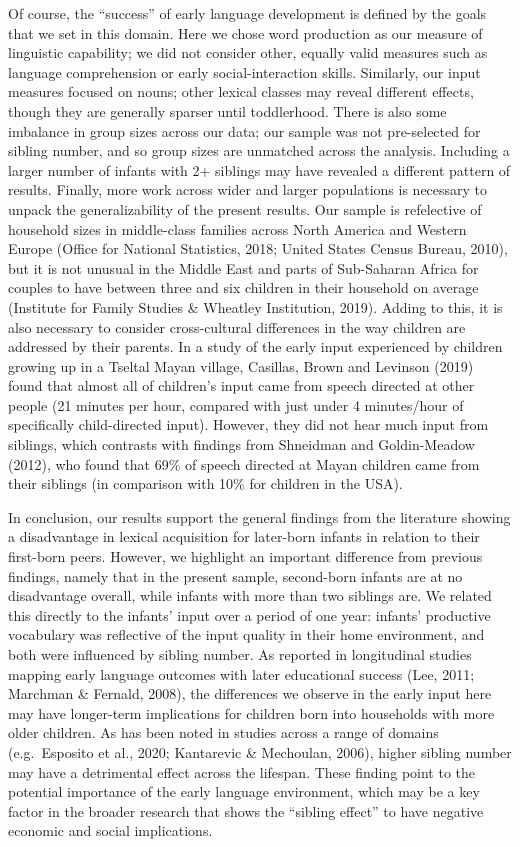 \documentclass[
  english,
  man,floatsintext]{apa6}
\begin{document}
Of course, the \enquote{success} of early language development is defined by the goals that we set in this domain. Here we chose word production as our measure of linguistic capability; we did not consider other, equally valid measures such as language comprehension or early social-interaction skills. Similarly, our input measures focused on nouns; other lexical classes may reveal different effects, though they are generally sparser until toddlerhood. There is also some imbalance in group sizes across our data; our sample was not pre-selected for sibling number, and so group sizes are unmatched across the analysis. Including a larger number of infants with 2+ siblings may have revealed a different pattern of results. Finally, more work across wider and larger populations is necessary to unpack the generalizability of the present results. Our sample is refelective of household sizes in middle-class families across North America and Western Europe (Office for National Statistics, 2018; United States Census Bureau, 2010), but it is not unusual in the Middle East and parts of Sub-Saharan Africa for couples to have between three and six children in their household on average (Institute for Family Studies \& Wheatley Institution, 2019). Adding to this, it is also necessary to consider cross-cultural differences in the way children are addressed by their parents. In a study of the early input experienced by children growing up in a Tseltal Mayan village, Casillas, Brown and Levinson (2019) found that almost all of children's input came from speech directed at other people (21 minutes per hour, compared with just under 4 minutes/hour of specifically child-directed input). However, they did not hear much input from siblings, which contrasts with findings from Shneidman and Goldin-Meadow (2012), who found that 69\% of speech directed at Mayan children came from their siblings (in comparison with 10\% for children in the USA).

In conclusion, our results support the general findings from the literature showing a disadvantage in lexical acquisition for later-born infants in relation to their first-born peers. However, we highlight an important difference from previous findings, namely that in the present sample, second-born infants are at no disadvantage overall, while infants with more than two siblings are. We related this directly to the infants' input over a period of one year: infants' productive vocabulary was reflective of the input quality in their home environment, and both were influenced by sibling number. As reported in longitudinal studies mapping early language outcomes with later educational success (Lee, 2011; Marchman \& Fernald, 2008), the differences we observe in the early input here may have longer-term implications for children born into households with more older children. As has been noted in studies across a range of domains (e.g.~Esposito et al., 2020; Kantarevic \& Mechoulan, 2006), higher sibling number may have a detrimental effect across the lifespan. These finding point to the potential importance of the early language environment, which may be a key factor in the broader research that shows the \enquote{sibling effect} to have negative economic and social implications.
\end{document}
